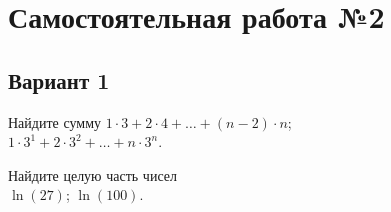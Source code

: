 
\section*{Самостоятельная работа №2}

\subsection*{Вариант 1}

\begin{problems}

\item
Найдите сумму
\subproblem \(
    1 \cdot 3 + 2 \cdot 4
    + \ldots + (n - 2) \cdot n %
\);
\\
\subproblem \(
    1 \cdot 3^{1} + 2 \cdot 3^{2}
    + \ldots + n \cdot 3^{n} %
\).

\item
Найдите целую часть чисел
\\
\subproblem $\ln(27)$;
\qquad
\subproblem $\ln(100)$.

\end{problems}

